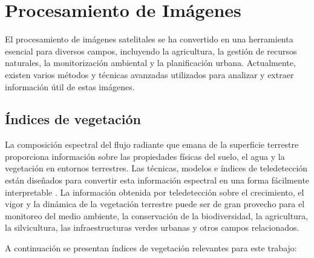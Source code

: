 \section{Procesamiento de Imágenes}
	El procesamiento de imágenes satelitales se ha convertido en una herramienta esencial para diversos
	campos, incluyendo la agricultura, la gestión de recursos naturales, la monitorización ambiental y 
 	la planificación urbana. Actualmente, existen varios métodos y técnicas avanzadas utilizados para
  	analizar y extraer información útil de estas imágenes. 
	

\subsection{Índices de vegetación}

La composición espectral del flujo radiante que emana de la superficie terrestre 
proporciona información sobre las propiedades físicas del suelo, el agua y la vegetación 
en entornos terrestres. Las técnicas, modelos e índices de teledetección están diseñados 
para convertir esta información espectral en una forma fácilmente interpretable \citep{Bannari1995}.
La información obtenida por teledetección sobre el crecimiento, el vigor y la dinámica de
la vegetación terrestre puede ser de gran provecho para el monitoreo del medio ambiente, 
la conservación de la biodiversidad, la agricultura, la silvicultura, las infraestructuras 
verdes urbanas y otros campos relacionados.

A continuación se presentan índices de vegetación relevantes para este trabajo:


